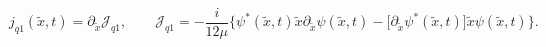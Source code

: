 \begin{equation}
\label{Eq:jq1}
j_{q1}(\tilde x, t)=\partial_{\tilde x}\mathcal{J}_{q1}, \qquad
\mathcal{J}_{q1}= -\frac{i}{12\mu}
\bigl \{ \psi^{*}(\tilde x,t)\tilde x \partial_{\tilde x}\psi(\tilde x,t)-
\bigl [ \partial_{\tilde x}\psi^{*}(\tilde x,t) \bigr ]\tilde x
\psi(\tilde x,t)
\bigr \}.
\end{equation}

